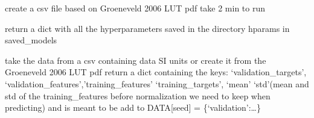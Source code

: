 \documentclass[letterpaper,10pt,english]{sphinxmanual}
\begin{document}

\begin{fulllineitems}
\label{\detokenize{CHF_model_api:CHF_model_api.tools.extractFromPdf}}
\pysigstartsignatures
{}
\pysigstopsignatures
\sphinxAtStartPar
create a csv file based on Groeneveld 2006 LUT pdf
take 2 min to run

\end{fulllineitems}


\begin{fulllineitems}
\label{\detokenize{CHF_model_api:CHF_model_api.tools.getHparamsSavedModel}}
\pysigstartsignatures
{}
\pysigstopsignatures
\sphinxAtStartPar
return a dict with all the hyperparameters saved
in the directory hparams in saved\_models

\end{fulllineitems}


\begin{fulllineitems}
\label{\detokenize{CHF_model_api:CHF_model_api.tools.loadData}}
\pysigstartsignatures
{}
\pysigstopsignatures
\sphinxAtStartPar
take the data from a csv containing data SI units
or create it from the Groeneveld 2006 LUT pdf
return a dict containing the keys:
‘validation\_targets’, ‘validation\_features’,’training\_features’
‘training\_targets’, ‘mean’ ‘std’(mean and std of the 
training\_features before normalization we need to keep when
predicting) and is meant to be add to DATA{[}seed{]} = \{‘validation’:…\}

\end{fulllineitems}
\end{document}
